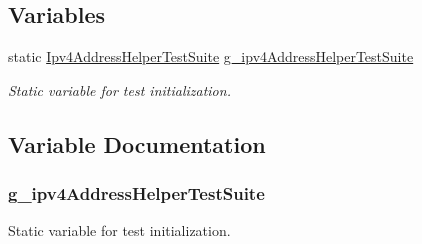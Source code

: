 \subsection*{Variables}
\begin{DoxyCompactItemize}
\item 
static \hyperlink{classIpv4AddressHelperTestSuite}{Ipv4\+Address\+Helper\+Test\+Suite} \hyperlink{ipv4-address-helper-test-suite_8cc_a2764fd036c917cd25c6db55fdd4728f9}{g\+\_\+ipv4\+Address\+Helper\+Test\+Suite}
\begin{DoxyCompactList}\small\item\em Static variable for test initialization. \end{DoxyCompactList}\end{DoxyCompactItemize}


\subsection{Variable Documentation}
\subsubsection[{\texorpdfstring{g\+\_\+ipv4\+Address\+Helper\+Test\+Suite}{g_ipv4AddressHelperTestSuite}}]{ g\+\_\+ipv4\+Address\+Helper\+Test\+Suite\hspace{0.3cm}{\ttfamily [static]}}\hypertarget{ipv4-address-helper-test-suite_8cc_a2764fd036c917cd25c6db55fdd4728f9}{}\label{ipv4-address-helper-test-suite_8cc_a2764fd036c917cd25c6db55fdd4728f9}


Static variable for test initialization. 

